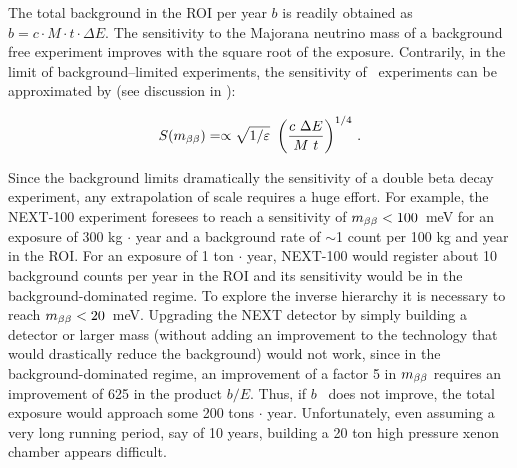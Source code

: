 
The total background in the ROI per year $b$ is readily obtained as $b = c \cdot M \cdot t \cdot \Delta E$. The sensitivity to the Majorana neutrino mass of a background free experiment improves with the square root of the exposure. Contrarily, in the limit of background--limited experiments, the sensitivity of \bbonu\ experiments can be approximated by (see discussion in \cite{Gomez-Cadenas:2015twa}):

\begin{equation}
{S}(\mbb) = \propto \sqrt{1/\varepsilon}\ \left(\frac{c~\Delta E}{M~t}\right)^{1/4}\,. \label{eq:Sensitivity3}
\end{equation}

Since the background limits dramatically the sensitivity of a double beta decay experiment, any extrapolation of scale requires a huge effort. For example, the NEXT-100 experiment foresees to reach a sensitivity of 
$m_{\beta\beta} < 100$~meV for an exposure of 300 kg $\cdot$ year and a background rate of $\sim$1 count per 100 kg and year in the ROI. For an exposure of 1 ton $\cdot$ year, NEXT-100 would register about 10 background counts per year in the ROI and its sensitivity would be in the background-dominated regime. To explore the inverse hierarchy it is necessary to reach $m_{\beta\beta} < 20$~meV. Upgrading the NEXT detector by simply building a detector or larger mass (without adding an improvement to the technology that would drastically reduce the background) would not work, since in the background-dominated regime, an improvement of a factor 5 in $m_{\beta\beta}$ requires an improvement of 625 in the product $b/E$. Thus, if $b$~ does not improve, the total exposure would approach some 200 tons $\cdot$ year. Unfortunately, even assuming a very long running period, say of 10 years, building a 20 ton high pressure xenon chamber appears difficult. 

